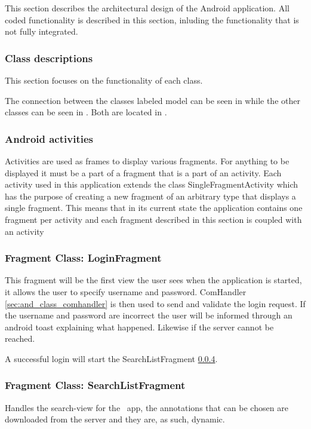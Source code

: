 This section describes the architectural design of the Android application. All coded functionality is described in this section, inluding the functionality that is not fully integrated. 
\subsubsection{Class descriptions}\label{sec:and_classdescription}
This section focuses on the functionality of each class.

The connection between the classes labeled model can be seen in
 while the other classes can be seen in
. Both are located in .

\subsubsection{Android activities} 
Activities are used as frames to display various fragments. For anything to be displayed it must be a part of a fragment that is a part of an activity. Each activity used in this application extends the class SingleFragmentActivity which has the purpose of creating a new fragment of an arbitrary type that displays a single fragment. This means that in its current state the application contains one fragment per activity and each fragment described in this section is coupled with an activity
\subsubsection{Fragment Class: LoginFragment}
This fragment will be the first view the user sees when the application is started, it allows the user to specify username and password. ComHandler \ref{sec:and_class_comhandler} is then used to send and validate the login request. If the username and password are incorrect the user will be informed through an android toast explaining what happened. Likewise if the server cannot be reached.

A successful login will start the SearchListFragment \ref{sec:and_class_search}.
\subsubsection{Fragment Class: SearchListFragment}\label{sec:and_class_search}
Handles the search-view for the \appName\ app, the annotations that can be chosen are downloaded from the server and they are, as such, dynamic.
